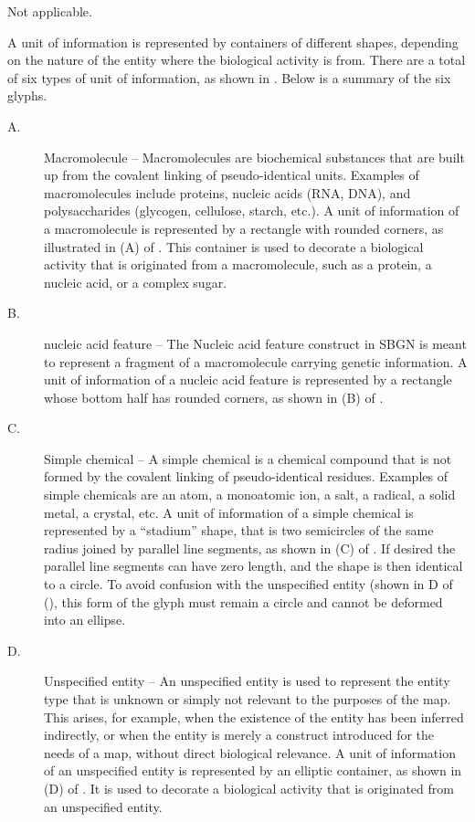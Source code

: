 \begin{glyphDescription}

\glyphSboTerm Not applicable.

\glyphContainer A unit of information is represented by containers of different shapes, depending on the nature of the entity where the biological activity is from. There are a total of six types of unit of information, as shown in .   Below is a summary of the six glyphs.

\begin{description}
\item[A.] Macromolecule -- Macromolecules are biochemical substances that are built up from the covalent linking of pseudo-identical units. Examples of macromolecules include proteins, nucleic acids (RNA, DNA), and polysaccharides (glycogen, cellulose, starch, etc.).  
A unit of information of a macromolecule is represented by a rectangle with rounded corners, as illustrated in (A) of .  This container is used to decorate a biological activity that is originated from a macromolecule, such as a protein, a nucleic acid, or a complex sugar.

\item[B.] nucleic acid feature -- The Nucleic acid feature construct in SBGN is meant to represent a fragment of a macromolecule carrying genetic information. A unit of information of a nucleic acid feature is represented by a rectangle whose bottom half has rounded corners, as shown in (B) of .

\item[C.] Simple chemical -- A simple chemical is a chemical compound that is not formed by the covalent linking of pseudo-identical residues. Examples of simple chemicals are an atom, a monoatomic ion, a salt, a radical, a solid metal, a crystal, etc. 
A unit of information of a simple chemical is represented by a “stadium” shape, that is two semicircles of the same
radius joined by parallel line segments, as shown in (C) of . If desired the parallel line segments can have zero length, and the shape is then identical to a circle. To avoid confusion with the unspecified entity (shown in D of (), this form of the glyph must remain a circle and cannot be deformed into an ellipse.

\item[D.] Unspecified entity -- An unspecified entity is used to represent the entity type that is unknown or simply not relevant to the purposes of the map. This arises, for example, when the existence of the entity has been inferred indirectly, or when the entity is merely a construct introduced for the needs of a map, without direct biological relevance. A unit of information of an unspecified entity is represented by an elliptic container, as shown in (D) of .  It is used to decorate a biological activity that is originated from an unspecified entity.


\end{description}
\end{glyphDescription}
